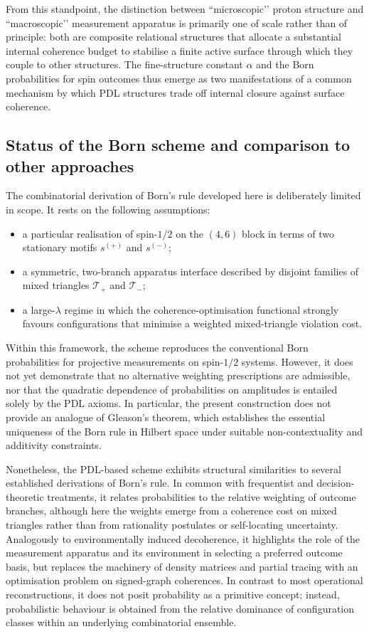 \documentclass[11pt,a4paper]{article}
\numberwithin{equation}{section}
\begin{document}
From this standpoint, the distinction between “microscopic’’ proton structure and “macroscopic’’ measurement apparatus is primarily one of scale rather than of principle: both are composite relational structures that allocate a substantial internal coherence budget to stabilise a finite active surface through which they couple to other structures. The fine-structure constant $\alpha$ and the Born probabilities for spin outcomes thus emerge as two manifestations of a common mechanism by which PDL structures trade off internal closure against surface coherence.

\subsection{Status of the Born scheme and comparison to other approaches}

The combinatorial derivation of Born's rule developed here is deliberately limited in scope. It rests on the following assumptions:
\begin{itemize}
  \item a particular realisation of spin-$1/2$ on the $(4,6)$ block in terms of two stationary motifs $s^{(+)}$ and $s^{(-)}$;
  \item a symmetric, two-branch apparatus interface described by disjoint families of mixed triangles $\mathcal{T}_+$ and $\mathcal{T}_-$;
  \item a large-$\lambda$ regime in which the coherence-optimisation functional strongly favours configurations that minimise a weighted mixed-triangle violation cost.
\end{itemize}
Within this framework, the scheme reproduces the conventional Born probabilities for projective measurements on spin-$1/2$ systems. However, it does not yet demonstrate that no alternative weighting prescriptions are admissible, nor that the quadratic dependence of probabilities on amplitudes is entailed solely by the PDL axioms. In particular, the present construction does not provide an analogue of Gleason’s theorem, which establishes the essential uniqueness of the Born rule in Hilbert space under suitable non-contextuality and additivity constraints.

Nonetheless, the PDL-based scheme exhibits structural similarities to several established derivations of Born's rule. In common with frequentist and decision-theoretic treatments, it relates probabilities to the relative weighting of outcome branches, although here the weights emerge from a coherence cost on mixed triangles rather than from rationality postulates or self-locating uncertainty. Analogously to environmentally induced decoherence, it highlights the role of the measurement apparatus and its environment in selecting a preferred outcome basis, but replaces the machinery of density matrices and partial tracing with an optimisation problem on signed-graph coherences. In contrast to most operational reconstructions, it does not posit probability as a primitive concept; instead, probabilistic behaviour is obtained from the relative dominance of configuration classes within an underlying combinatorial ensemble.
\end{document}
